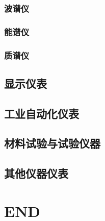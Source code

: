 \documentclass[UTF8]{../../ApplicationUniverse}
\begin{document}
        \subsection{波谱仪}
        \subsection{能谱仪}
        \subsection{质谱仪}
\section{显示仪表}
\section{工业自动化仪表}
\section{材料试验与试验仪器}
\section{其他仪器仪表}


\chapter{END}
\end{document}

